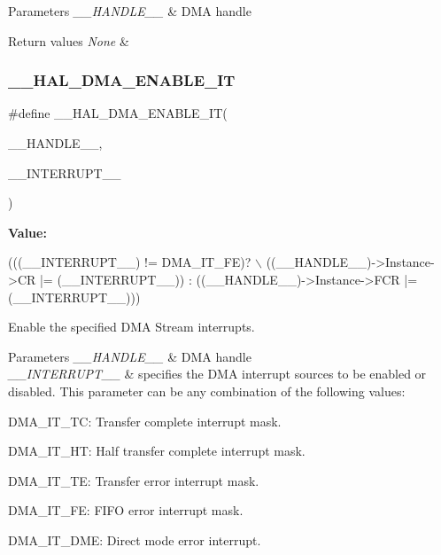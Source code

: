 \begin{DoxyParams}{Parameters}
{\em \+\_\+\+\_\+\+H\+A\+N\+D\+L\+E\+\_\+\+\_\+} & D\+MA handle \\
\hline
\end{DoxyParams}

\begin{DoxyRetVals}{Return values}
{\em None} & \\
\hline
\end{DoxyRetVals}
\mbox{\label{group___d_m_a_ga2124233229c04ca90b790cd8cddfa98b}} 
\subsubsection{\texorpdfstring{\+\_\+\+\_\+\+H\+A\+L\+\_\+\+D\+M\+A\+\_\+\+E\+N\+A\+B\+L\+E\+\_\+\+IT}{\_\_HAL\_DMA\_ENABLE\_IT}}
{\footnotesize\ttfamily \#define \+\_\+\+\_\+\+H\+A\+L\+\_\+\+D\+M\+A\+\_\+\+E\+N\+A\+B\+L\+E\+\_\+\+IT(\begin{DoxyParamCaption}\item[{}]{\+\_\+\+\_\+\+H\+A\+N\+D\+L\+E\+\_\+\+\_\+,  }\item[{}]{\+\_\+\+\_\+\+I\+N\+T\+E\+R\+R\+U\+P\+T\+\_\+\+\_\+ }\end{DoxyParamCaption})}

{\bfseries Value\+:}
\begin{DoxyCode}
(((\_\_INTERRUPT\_\_) != DMA\_IT\_FE)? \(\backslash\)
((\_\_HANDLE\_\_)->Instance->CR |= (\_\_INTERRUPT\_\_)) : ((\_\_HANDLE\_\_)->Instance->FCR |= (\_\_INTERRUPT\_\_)))
\end{DoxyCode}


Enable the specified D\+MA Stream interrupts. 


\begin{DoxyParams}{Parameters}
{\em \+\_\+\+\_\+\+H\+A\+N\+D\+L\+E\+\_\+\+\_\+} & D\+MA handle \\
\hline
{\em \+\_\+\+\_\+\+I\+N\+T\+E\+R\+R\+U\+P\+T\+\_\+\+\_\+} & specifies the D\+MA interrupt sources to be enabled or disabled. This parameter can be any combination of the following values\+: \begin{DoxyItemize}
\item D\+M\+A\+\_\+\+I\+T\+\_\+\+TC\+: Transfer complete interrupt mask. \item D\+M\+A\+\_\+\+I\+T\+\_\+\+HT\+: Half transfer complete interrupt mask. \item D\+M\+A\+\_\+\+I\+T\+\_\+\+TE\+: Transfer error interrupt mask. \item D\+M\+A\+\_\+\+I\+T\+\_\+\+FE\+: F\+I\+FO error interrupt mask. \item D\+M\+A\+\_\+\+I\+T\+\_\+\+D\+ME\+: Direct mode error interrupt. \end{DoxyItemize}
\\
\hline
\end{DoxyParams}

